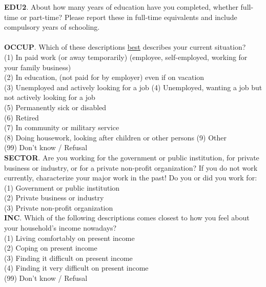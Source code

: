 \documentclass[11pt, ngerman,english,a4]{article}
\begin{document}
\noindent \textbf{EDU2}. About how many years of education have you completed, whether full-time or part-time? Please report these in full-time equivalents and include compulsory years of schooling. \\
 \\

\noindent \textbf{OCCUP}. Which of these descriptions \underline{best} describes your current situation? \\
(1) In paid work (or away temporarily) (employee, self-employed, working for your family business) \\
(2) In education, (not paid for by employer) even if on vacation \\
(3) Unemployed and actively looking for a job 
(4) Unemployed, wanting a job but not actively looking for a job \\
(5) Permanently sick or disabled \\
(6) Retired \\
(7) In community or military service \\
(8) Doing housework, looking after children or other persons 
(9) Other \\
(99) Don't know / Refusal \\

\noindent \textbf{SECTOR}. Are you working for the government or public institution, for private business or industry, or for a private non-profit organization? If you do not work currently, characterize your major work in the past! Do you or did you work for: \\ 
(1) Government or public institution \\
(2)	Private business or industry \\
(3)	Private non-profit organization \\ 

\noindent \textbf{INC}. Which of the following descriptions comes closest to how you feel about your household’s income nowadays? \\
(1) Living comfortably on present income \\
(2) Coping on present income \\
(3) Finding it difficult on present income \\
(4) Finding it very difficult on present income \\
(99) Don't know / Refusal \\
\end{document}
